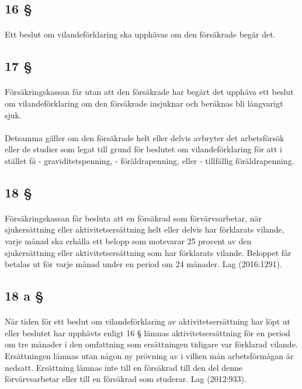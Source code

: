\documentclass[a4paper,notitlepage,openany,10pt]{book}
\begin{document}
\subsection*{16 §}
\paragraph*{}
Ett beslut om vilandeförklaring ska upphävas om den försäkrade begär det.
\subsection*{17 §}
\paragraph*{}
Försäkringskassan får utan att den försäkrade har begärt det upphäva ett beslut om vilandeförklaring om den försäkrade insjuknar och beräknas bli långvarigt sjuk.
\paragraph*{}
Detsamma gäller om den försäkrade helt eller delvis avbryter det arbetsförsök eller de studier som legat till grund för beslutet om vilandeförklaring för att i stället få
\newline - graviditetspenning,
\newline - föräldrapenning, eller
\newline - tillfällig föräldrapenning.
\subsection*{18 §}
\paragraph*{}
Försäkringskassan får besluta att en försäkrad som förvärvsarbetar, när sjukersättning eller aktivitetsersättning helt eller delvis har förklarats vilande, varje månad ska erhålla ett belopp som motsvarar 25 procent av den sjukersättning eller aktivitetsersättning som har förklarats vilande. Beloppet får betalas ut för varje månad under en period om 24 månader.
Lag (2016:1291).
\subsection*{18 a §}
\paragraph*{}
När tiden för ett beslut om vilandeförklaring av aktivitetsersättning har löpt ut eller beslutet har upphävts enligt 16 § lämnas aktivitetsersättning för en period om tre månader i den omfattning som ersättningen tidigare var förklarad vilande. Ersättningen lämnas utan någon ny prövning av i vilken mån arbetsförmågan är nedsatt. Ersättning lämnas inte till en försäkrad till den del denne förvärvsarbetar eller till en försäkrad som studerar.
Lag (2012:933).
\end{document}

